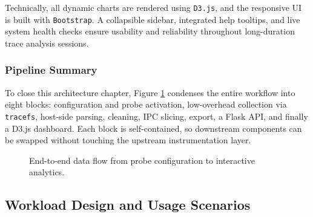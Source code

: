 \documentclass[a4paper,12pt]{report}
\begin{document}
Technically, all dynamic charts are rendered using \texttt{D3.js}, and the responsive UI is built with \texttt{Bootstrap}. A collapsible sidebar, integrated help tooltips, and live system health checks ensure usability and reliability throughout long-duration trace analysis sessions.

\subsubsection{Pipeline Summary}

To close this architecture chapter, Figure \ref{fig:pipeline} condenses the entire workflow into eight blocks: configuration and probe activation, low-overhead collection via \texttt{tracefs}, host-side parsing, cleaning, IPC slicing, export, a Flask API, and finally a D3.js dashboard.  Each block is self-contained, so downstream components can be swapped without touching the upstream instrumentation layer.

\begin{figure}[H]
\centering
{}
\caption{End-to-end data flow from probe configuration to interactive analytics.}
\label{fig:pipeline}
\end{figure}

\subsection{Workload Design and Usage Scenarios}
\end{document}
